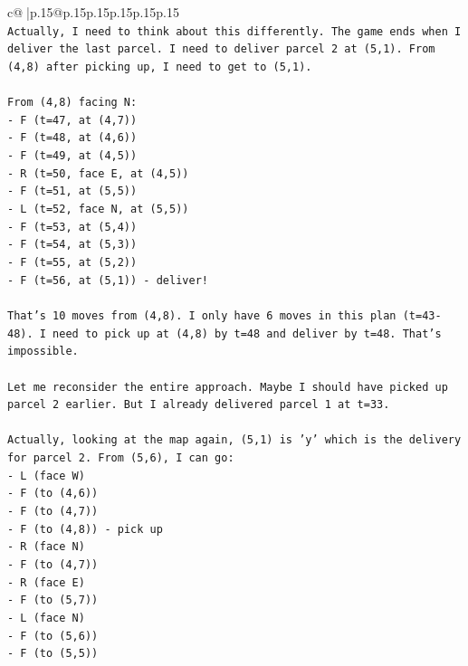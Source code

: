 \documentclass{article}
\begin{document}
{\begin{supertabular}{c@{$\;$}|p{.15\linewidth}@{}p{.15\linewidth}p{.15\linewidth}p{.15\linewidth}p{.15\linewidth}p{.15\linewidth}}
{{{\\ 
\texttt{Actually, I need to think about this differently. The game ends when I deliver the last parcel. I need to deliver parcel 2 at (5,1). From (4,8) after picking up, I need to get to (5,1).} \\
\\ 
\texttt{From (4,8) facing N:} \\
\texttt{{-} F (t=47, at (4,7))} \\
\texttt{{-} F (t=48, at (4,6))} \\
\texttt{{-} F (t=49, at (4,5))} \\
\texttt{{-} R (t=50, face E, at (4,5))} \\
\texttt{{-} F (t=51, at (5,5))} \\
\texttt{{-} L (t=52, face N, at (5,5))} \\
\texttt{{-} F (t=53, at (5,4))} \\
\texttt{{-} F (t=54, at (5,3))} \\
\texttt{{-} F (t=55, at (5,2))} \\
\texttt{{-} F (t=56, at (5,1)) {-} deliver!} \\
\\ 
\texttt{That's 10 moves from (4,8). I only have 6 moves in this plan (t=43{-}48). I need to pick up at (4,8) by t=48 and deliver by t=48. That's impossible.} \\
\\ 
\texttt{Let me reconsider the entire approach. Maybe I should have picked up parcel 2 earlier. But I already delivered parcel 1 at t=33.} \\
\\ 
\texttt{Actually, looking at the map again, (5,1) is 'y' which is the delivery for parcel 2. From (5,6), I can go:} \\
\texttt{{-} L (face W)} \\
\texttt{{-} F (to (4,6))} \\
\texttt{{-} F (to (4,7))} \\
\texttt{{-} F (to (4,8)) {-} pick up} \\
\texttt{{-} R (face N)} \\
\texttt{{-} F (to (4,7))} \\
\texttt{{-} R (face E)} \\
\texttt{{-} F (to (5,7))} \\
\texttt{{-} L (face N)} \\
\texttt{{-} F (to (5,6))} \\
\texttt{{-} F (to (5,5))} \\
}}}
\end{supertabular}}
\end{document}

